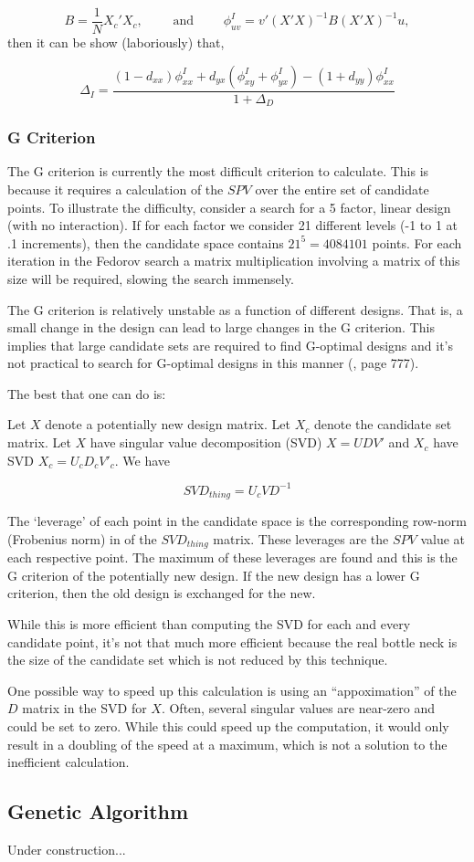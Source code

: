 \documentclass{article}\usepackage[]{graphicx}\usepackage[]{color}
\begin{document}
$$ B = \frac{1}{N}X_c'X_c, \quad\quad \mbox{ and } \quad\quad \phi^I_{uv} = v' (X'X)^{-1} B (X'X)^{-1} u,$$ then it can be show (laboriously) that,

$$ \Delta_I = \frac{(1 - d_{xx}) \phi^I_{xx} + d_{yx} (\phi^I_{xy} + \phi^I_{yx}) - (1 + d_{yy})\phi^I_{xx}}{1 + \Delta_D} $$

\subsubsection{G Criterion}
The G criterion is currently the most difficult criterion to calculate. This is because it requires a calculation of the $SPV$ over the entire set of candidate points. To illustrate the difficulty, consider a search for a 5 factor, linear design (with no interaction). If for each factor we consider 21 different levels (-1 to 1 at .1 increments), then the candidate space contains $21^5 = 4084101$ points. For each iteration in the Fedorov search a matrix multiplication involving a matrix of this size will be required, slowing the search immensely.

The G criterion is relatively unstable as a function of different designs. That is, a small change in the design can lead to large changes in the G criterion. This implies that large candidate sets are required to find G-optimal designs and it's not practical to search for G-optimal designs in this manner (\cite{sas}, page 777).

The best that one can do is:

Let $X$ denote a potentially new design matrix. Let $X_c$ denote the candidate set matrix. Let $X$ have singular value decomposition (SVD) $X = U D V'$ and $X_c$ have SVD $X_c = U_c D_c V'_c$. We have

$$ SVD_{thing} = U_c V D^{-1} $$

The `leverage' of each point in the candidate space is the corresponding row-norm (Frobenius norm) in of the $SVD_{thing}$ matrix. These leverages are the $SPV$ value at each respective point. The maximum of these leverages are found and this is the G criterion of the potentially new design. If the new design has a lower G criterion, then the old design is exchanged for the new.

While this is more efficient than computing the SVD for each and every candidate point, it's not that much more efficient because the real bottle neck is the size of the candidate set which is not reduced by this technique.

One possible way to speed up this calculation is using an ``appoximation'' of the $D$ matrix in the SVD for $X$. Often, several singular values are near-zero and could be set to zero. While this could speed up the computation, it would only result in a doubling of the speed at a maximum, which is not a solution to the inefficient calculation.

\subsection{Genetic Algorithm}

Under construction...

\nocite{*}


\end{document}
